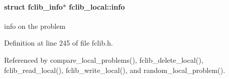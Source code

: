 \paragraph[{info}]{\setlength{\rightskip}{0pt plus 5cm}struct {\bf fclib\+\_\+info}$\ast$ fclib\+\_\+local\+::info}\label{structfclib__local_ababce9da71cdb99e4928a596dde8bc89}


info on the problem 



Definition at line 245 of file fclib.\+h.



Referenced by compare\+\_\+local\+\_\+problems(), fclib\+\_\+delete\+\_\+local(), fclib\+\_\+read\+\_\+local(), fclib\+\_\+write\+\_\+local(), and random\+\_\+local\+\_\+problem().

